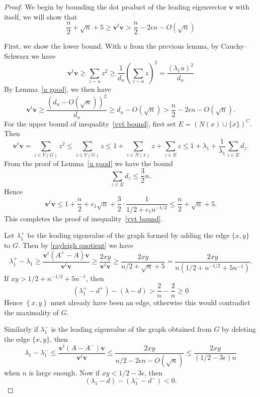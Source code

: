 \begin{proof}
We begin by bounding the dot product of the leading eigenvector $\textbf{v}$
with itself, we will show that
\begin{equation}\label{vvt bound}
\frac{n}{2} + \sqrt{n} + 5 \geq \textbf{v}^t\textbf{v} > \frac{n}{2} - 2 \epsilon n  - O(\sqrt{n})
\end{equation}


\noindent First, we show the lower bound.  With $u$ from the previous lemma, by Cauchy--Schwarz we have
\[  \textbf{v}^t\textbf{v} \geq \sum_{z \sim u} z^2 \geq \frac{1}{d_u}\left( \sum_{z \sim u} z \right)^2 = \frac{(\lambda_1 u)^2}{d_u} \]
By Lemma~\ref{u good}, we then have
 \[\textbf{v}^t\textbf{v} \geq \frac{(d_u - O(\sqrt{n}))^2}{d_u} \geq d_u - O(\sqrt{n}) > \frac{n}{2} - 2 \epsilon n  - O(\sqrt{n}) .\]
For the upper bound of inequality~\eqref{vvt bound}, first set $E = \left( N(x) \cup \{x\}\right)^C$.  Then
 \[ \textbf{v}^t\textbf{v} = \sum_{z \in V(G)} z^2 \leq \sum_{z \in V(G)} z \leq 1 + \sum_{z \in N(x)} z + \sum_{z \in E} z \leq 1 + \lambda_1 + \frac{1}{\lambda_1} \sum_{z \in E} d_z .\]
From the proof of Lemma~\ref{u good} we have the bound
 \[ \sum_{ z \in E} d_z \leq \frac{3}{2} n .\]
Hence
 \[ \textbf{v}^t \textbf{v}  \leq 1 + \frac{n}{2} + c_1 \sqrt{n} + \frac{3}{2} \cdot \frac{1}{1/2 + c_1 n^{-1/2}} \leq \frac{n}{2} + \sqrt{n} + 5 .\]
This completes the proof of inequality~\eqref{vvt bound}.


 Let $\lambda_1^+$ be the leading eigenvalue of the graph formed by adding the 
 edge $\{x,y\}$ to $G$.  Then by \eqref{rayleigh quotient} we have
  \[ \lambda_1^+ - \lambda_1 \geq \frac{\textbf{v}^t (A^+-A) \textbf{v}}{\textbf{v}^t \textbf{v}} \geq \frac{2xy}{\textbf{v}^t \textbf{v}} \geq \frac{2xy}{n/2 + \sqrt{n} + 5}  = \frac{2xy}{n(1/2+n^{-1/2} + 5 n^{-1})}.\]
If $xy > 1/2+n^{-1/2} + 5n^{-1}$, then
\[ (\lambda_1^+ - d^+) - (\lambda - d) > \frac{2}{n} - \frac{2}{n} \geq 0\]
Hence $\left\{x,y\right\}$ must already have been an edge, otherwise this
would contradict the maximality of $G$.

Similarly if $\lambda_1^-$ is the leading eigenvalue of the graph obtained
from $G$ by deleting the edge $\{x,y\}$, then  
  \[ \lambda_1 - \lambda_1^- \leq \frac{\textbf{v}^t (A-A^-) \textbf{v}}{\textbf{v}^t \textbf{v}} \leq \frac{2xy}{n/2 - 2\epsilon n - O(\sqrt{n})} \leq \frac{2xy}{(1/2 - 3 \epsilon)n}\]
when $n$ is large enough.  Now if
$xy < 1/2 - 3\epsilon$, then 
 \[ (\lambda_1 - d) - (\lambda_1^- - d^-) < 0 .\] %

\end{proof}

